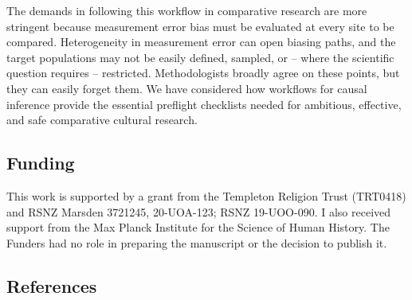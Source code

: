\documentclass[
  single column]{article}
\begin{document}
The demands in following this workflow in comparative research are more
stringent because measurement error bias must be evaluated at every site
to be compared. Heterogeneity in measurement error can open biasing
paths, and the target populations may not be easily defined, sampled, or
-- where the scientific question requires -- restricted. Methodologists
broadly agree on these points, but they can easily forget them. We have
considered how workflows for causal inference provide the essential
preflight checklists needed for ambitious, effective, and safe
comparative cultural research.

\newpage{}

\subsection{Funding}\label{funding}

This work is supported by a grant from the Templeton Religion Trust
(TRT0418) and RSNZ Marsden 3721245, 20-UOA-123; RSNZ 19-UOO-090. I also
received support from the Max Planck Institute for the Science of Human
History. The Funders had no role in preparing the manuscript or the
decision to publish it.

\newpage{}

\subsection{References}\label{references}
\end{document}
